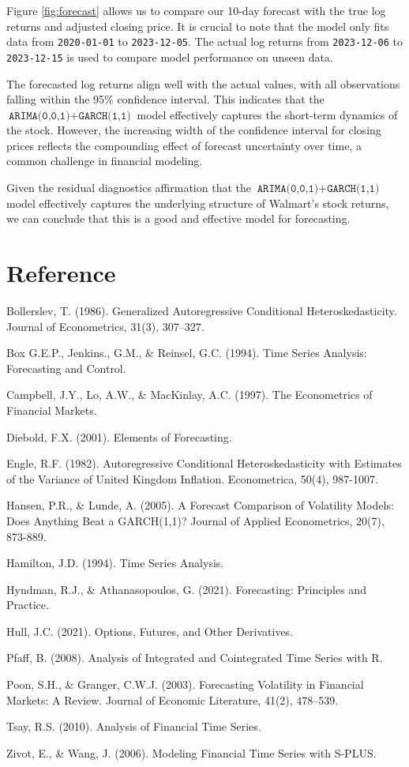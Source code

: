 \documentclass{article}
\newcommand{\1}{\mathbbm{1}}
\theoremstyle{definition}
\begin{document}
Figure \ref{fig:forecast} allows us to compare our 10-day forecast with the true log returns and adjusted closing price. It is crucial to note that the model only fits data from \texttt{2020-01-01} to \texttt{2023-12-05}. The actual log returns from \texttt{2023-12-06} to \texttt{2023-12-15} is used to compare model performance on unseen data.

The forecasted log returns align well with the actual values, with all observations falling within the 95\% confidence interval. This indicates that the $\texttt{ARIMA(0,0,1)} + \texttt{GARCH(1,1)}$ model effectively captures the short-term dynamics of the stock. However, the increasing width of the confidence interval for closing prices reflects the compounding effect of forecast uncertainty over time, a common challenge in financial modeling. 

Given the residual diagnostics affirmation that the $\texttt{ARIMA(0,0,1)} + \texttt{GARCH(1,1)}$ model effectively captures the underlying structure of Walmart's stock returns, we can conclude that this is a good and effective model for forecasting.






\newpage
\section*{Reference}

Bollerslev, T. (1986). Generalized Autoregressive Conditional Heteroskedasticity.
Journal of Econometrics, 31(3), 307–327.

Box G.E.P., Jenkins., G.M., \& Reinsel, G.C. (1994). Time Series Analysis: Forecasting and Control.

Campbell, J.Y., Lo, A.W., \& MacKinlay, A.C. (1997). The Econometrics of Financial Markets.

Diebold, F.X. (2001). Elements of Forecasting.

Engle, R.F. (1982). Autoregressive Conditional Heteroskedasticity with Estimates of the Variance of United Kingdom Inflation. Econometrica, 50(4), 987-1007.

Hansen, P.R., \& Lunde, A. (2005). A Forecast Comparison of Volatility Models: Does Anything Beat a GARCH(1,1)?
Journal of Applied Econometrics, 20(7), 873-889.

Hamilton, J.D. (1994). Time Series Analysis.

Hyndman, R.J., \& Athanasopoulos, G. (2021). Forecasting: Principles and Practice.

Hull, J.C. (2021). Options, Futures, and Other Derivatives.

Pfaff, B. (2008). Analysis of Integrated and Cointegrated Time Series with R.

Poon, S.H., \& Granger, C.W.J. (2003). Forecasting Volatility in Financial Markets: A Review.
Journal of Economic Literature, 41(2), 478–539.

Tsay, R.S. (2010). Analysis of Financial Time Series.

Zivot, E., \& Wang, J. (2006). Modeling Financial Time Series with S-PLUS.
\end{document}
